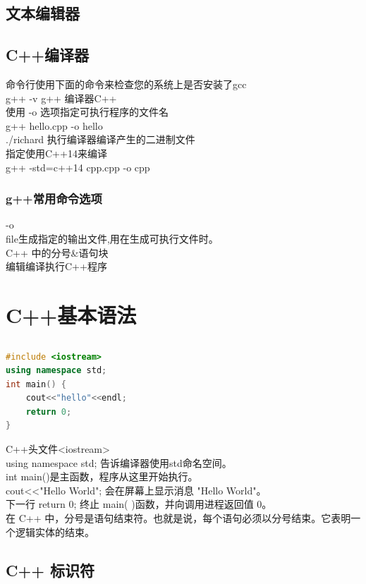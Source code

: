 \documentclass[12pt,twiside,a4paper]{ctexbook}
\numberwithin{chapter}{part}
\begin{document}
\section{文本编辑器}

\section{C++编译器}
命令行使用下面的命令来检查您的系统上是否安装了gcc\\
g++ -v
g++ 编译器C++\\
使用 -o 选项指定可执行程序的文件名\\
g++ hello.cpp -o hello\\
./richard 执行编译器编译产生的二进制文件\\
指定使用C++14来编译\\
g++ -std=c++14 cpp.cpp -o cpp 

\subsection{g++常用命令选项}
-o\\
file生成指定的输出文件,用在生成可执行文件时。\\
C++ 中的分号\&语句块\\
编辑编译执行C++程序

\chapter{C++基本语法}
\section{}
\begin{lstlisting}[language=C++]
#include <iostream>
using namespace std;
int main() {
	cout<<"hello"<<endl;
	return 0;
}
\end{lstlisting}
C++头文件<iostream>\\
using namespace std; 告诉编译器使用std命名空间。\\
int main()是主函数，程序从这里开始执行。\\
cout<<"Hello World"; 会在屏幕上显示消息 "Hello World"。\\
下一行 return 0; 终止 main( )函数，并向调用进程返回值 0。\\
在 C++ 中，分号是语句结束符。也就是说，每个语句必须以分号结束。它表明一个逻辑实体的结束。

\section{C++ 标识符}
\end{document}

